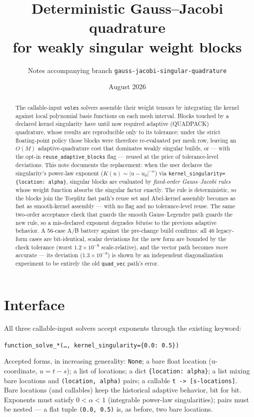 \documentclass[11pt]{article}
\title{Deterministic Gauss--Jacobi quadrature\\ for weakly singular weight
blocks}
\author{Notes accompanying branch \texttt{gauss-jacobi-singular-quadrature}}
\date{August 2026}
\newcommand{\voles}{\texttt{voles}}
\newcommand{\kw}[1]{\texttt{#1}}
\begin{document}
\maketitle

\begin{abstract}
\noindent
The callable-input \voles{} solvers assemble their weight tensors by
integrating the kernel against local polynomial basis functions on each mesh
interval. Blocks touched by a declared kernel singularity have until now
required adaptive (QUADPACK) quadrature, whose results are reproducible only
to its tolerance; under the strict floating-point policy those blocks were
therefore re-evaluated per mesh row, leaving an $O(M)$
adaptive-quadrature cost that dominates weakly singular builds, or --- with
the opt-in \kw{reuse\_adaptive\_blocks} flag --- reused at the price of
tolerance-level deviations. This note documents the replacement: when the
user declares the singularity's power-law exponent
($K(u)\sim|u-u_0|^{-\alpha}$) via
\kw{kernel\_singularity=\{location:\ alpha\}}, singular blocks are evaluated
by \emph{fixed-order Gauss--Jacobi rules} whose weight function absorbs the
singular factor exactly. The rule is deterministic, so the blocks join the
Toeplitz fast path's reuse set and Abel-kernel assembly becomes as fast as
smooth-kernel assembly --- with no flag and no tolerance-level reuse. The
same two-order acceptance check that guards the smooth Gauss--Legendre path
guards the new rule, so a mis-declared exponent degrades \emph{bitwise} to
the previous adaptive behavior. A 56-case A/B battery against the pre-change
build confirms: all 46 legacy-form cases are bit-identical, scalar
deviations for the new form are bounded by the check tolerance
(worst $1.2\times10^{-9}$ scale-relative), and the vector path becomes
\emph{more} accurate --- its deviation ($1.3\times10^{-8}$) is shown by an
independent diagonalization experiment to be entirely the old
\kw{quad\_vec} path's error.
\end{abstract}

\section{Interface}

All three callable-input solvers accept exponents through the existing
keyword:
\begin{center}
\kw{function\_solve\_*(\dots, kernel\_singularity=\{0.0:\ 0.5\})}
\end{center}
Accepted forms, in increasing generality: \kw{None}; a bare float location
(u-coordinate, $u=t-s$); a list of locations; a dict
\kw{\{location:\ alpha\}}; a list mixing bare locations and
\kw{(location, alpha)} pairs; a callable \kw{t -> [s-locations]}. Bare
locations (and callables) keep the historical adaptive behavior, bit for
bit. Exponents must satisfy $0<\alpha<1$ (integrable power-law
singularities); pairs must be nested --- a flat tuple \kw{(0.0, 0.5)} is,
as before, two bare locations.
\end{document}
